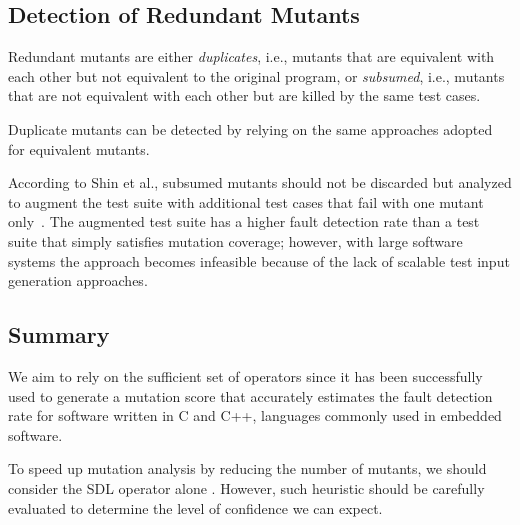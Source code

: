 \subsection{Detection of Redundant Mutants}
\label{sec:background:redundant}
Redundant mutants are either \emph{duplicates}, i.e., mutants that are equivalent with each other but not equivalent to the original program, or \emph{subsumed}, i.e., mutants that are not equivalent with each other but are killed by the same test cases. 

Duplicate mutants can be detected by relying on the same approaches adopted for equivalent mutants. 

According to Shin et al., subsumed mutants should not be discarded but analyzed to augment the test suite with additional test cases that fail with one mutant only~\cite{Shin:TSE:DCriterion:2018}. 
The augmented test suite has a higher
 fault detection rate than a test suite that simply satisfies mutation coverage; however, with large software systems the approach becomes infeasible because of the lack of scalable test input generation approaches.



\subsection{Summary}
\label{sec:back:summary}

We aim to rely on the sufficient set of operators since it has been successfully used to generate a mutation score that accurately estimates the fault detection rate for software written in C and C++, languages commonly used in embedded software.

To speed up mutation analysis by reducing the number of mutants, we should consider the SDL operator alone . However, such heuristic should be carefully evaluated to determine the level of confidence we can expect.

